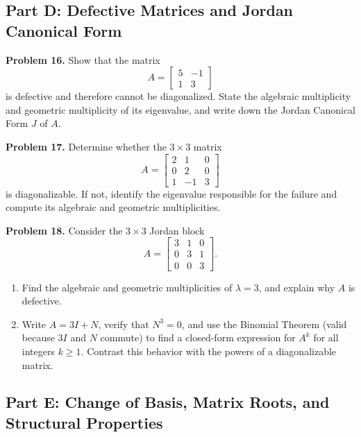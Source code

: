 \documentclass[11pt, letterpaper]{article}
\theoremstyle{definition}
\theoremstyle{remark}
\begin{document}
\subsection{Part D: Defective Matrices and Jordan Canonical Form}

\textbf{Problem 16.}\label{prob:16}
Show that the matrix
\[
A = \begin{bmatrix} 5 & -1 \\ 1 & 3 \end{bmatrix}
\]
is defective and therefore cannot be diagonalized. State the algebraic multiplicity and geometric multiplicity of its eigenvalue, and write down the Jordan Canonical Form $J$ of $A$.

\textbf{Problem 17.}\label{prob:17}
Determine whether the $3 \times 3$ matrix
\[
A = \begin{bmatrix} 2 & 1 & 0 \\ 0 & 2 & 0 \\ 1 & -1 & 3 \end{bmatrix}
\]
is diagonalizable. If not, identify the eigenvalue responsible for the failure and compute its algebraic and geometric multiplicities.

\textbf{Problem 18.}\label{prob:18}
Consider the $3 \times 3$ Jordan block
\[
A = \begin{bmatrix} 3 & 1 & 0 \\ 0 & 3 & 1 \\ 0 & 0 & 3 \end{bmatrix}.
\]
\begin{enumerate}[label=(\alph*)]
    \item Find the algebraic and geometric multiplicities of $\lambda = 3$, and explain why $A$ is defective.
    \item Write $A = 3I + N$, verify that $N^{3} = 0$, and use the Binomial Theorem (valid because $3I$ and $N$ commute) to find a closed-form expression for $A^{k}$ for all integers $k \ge 1$. Contrast this behavior with the powers of a diagonalizable matrix.
\end{enumerate}

\subsection{Part E: Change of Basis, Matrix Roots, and Structural Properties}
\end{document}
